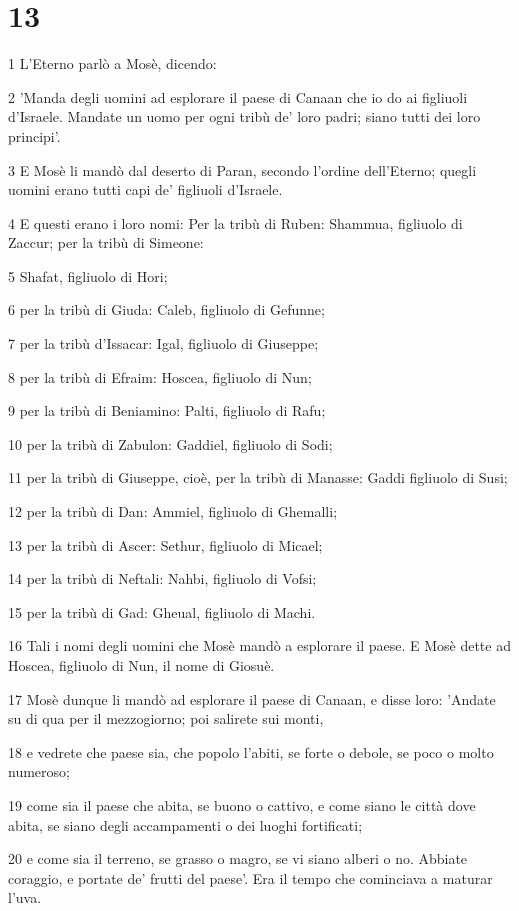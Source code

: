 \chapter{13}

\par 1 L'Eterno parlò a Mosè, dicendo:
\par 2 'Manda degli uomini ad esplorare il paese di Canaan che io do ai figliuoli d'Israele. Mandate un uomo per ogni tribù de' loro padri; siano tutti dei loro principi'.
\par 3 E Mosè li mandò dal deserto di Paran, secondo l'ordine dell'Eterno; quegli uomini erano tutti capi de' figliuoli d'Israele.
\par 4 E questi erano i loro nomi: Per la tribù di Ruben: Shammua, figliuolo di Zaccur; per la tribù di Simeone:
\par 5 Shafat, figliuolo di Hori;
\par 6 per la tribù di Giuda: Caleb, figliuolo di Gefunne;
\par 7 per la tribù d'Issacar: Igal, figliuolo di Giuseppe;
\par 8 per la tribù di Efraim: Hoscea, figliuolo di Nun;
\par 9 per la tribù di Beniamino: Palti, figliuolo di Rafu;
\par 10 per la tribù di Zabulon: Gaddiel, figliuolo di Sodi;
\par 11 per la tribù di Giuseppe, cioè, per la tribù di Manasse: Gaddi figliuolo di Susi;
\par 12 per la tribù di Dan: Ammiel, figliuolo di Ghemalli;
\par 13 per la tribù di Ascer: Sethur, figliuolo di Micael;
\par 14 per la tribù di Neftali: Nahbi, figliuolo di Vofsi;
\par 15 per la tribù di Gad: Gheual, figliuolo di Machi.
\par 16 Tali i nomi degli uomini che Mosè mandò a esplorare il paese. E Mosè dette ad Hoscea, figliuolo di Nun, il nome di Giosuè.
\par 17 Mosè dunque li mandò ad esplorare il paese di Canaan, e disse loro: 'Andate su di qua per il mezzogiorno; poi salirete sui monti,
\par 18 e vedrete che paese sia, che popolo l'abiti, se forte o debole, se poco o molto numeroso;
\par 19 come sia il paese che abita, se buono o cattivo, e come siano le città dove abita, se siano degli accampamenti o dei luoghi fortificati;
\par 20 e come sia il terreno, se grasso o magro, se vi siano alberi o no. Abbiate coraggio, e portate de' frutti del paese'. Era il tempo che cominciava a maturar l'uva.
